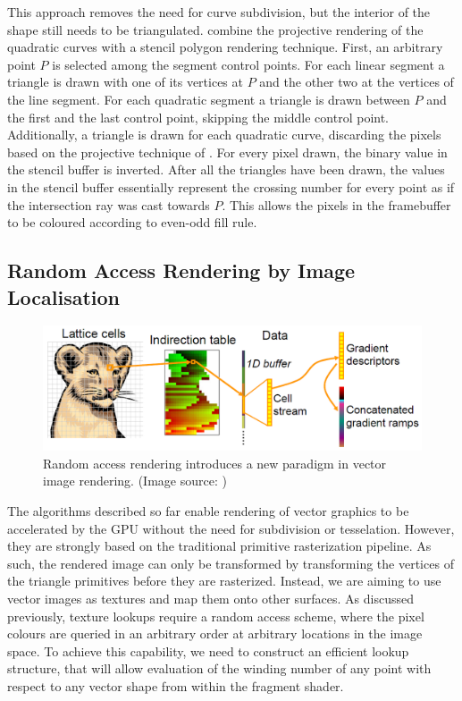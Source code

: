 \documentclass[11pt,a4paper,twoside]{article}
\begin{document}
This approach removes the need for curve subdivision, but the interior of the shape still needs to be triangulated. \cite{Kokojima06} combine the projective rendering of the quadratic curves with a stencil polygon rendering technique. First, an arbitrary point $P$ is selected among the segment control points. For each linear segment a triangle is drawn with one of its vertices at $P$ and the other two at the vertices of the line segment. For each quadratic segment a triangle is drawn between $P$ and the first and the last control point, skipping the middle control point. Additionally, a triangle is drawn for each quadratic curve, discarding the pixels based on the projective technique of \cite{LoopBlinn05}. For every pixel drawn, the binary value in the stencil buffer is inverted. After all the triangles have been drawn, the values in the stencil buffer essentially represent the crossing number for every point as if the intersection ray was cast towards $P$. This allows the pixels in the framebuffer to be coloured according to even-odd fill rule.

\subsection {Random Access Rendering by Image Localisation}

\begin {figure}
	\centering
	\includegraphics [width=1.0\columnwidth] {figures/nehab_hoppe}
	\caption {Random access rendering introduces a new paradigm in vector image rendering. (Image source: \cite{NehabHoppe08}) }
	\label {fig:nehab_hoppe}
\end {figure}

The algorithms described so far enable rendering of vector graphics to be accelerated by the GPU without the need for subdivision or tesselation. However, they are strongly based on the traditional primitive rasterization pipeline. As such, the rendered image can only be transformed by transforming the vertices of the triangle primitives before they are rasterized. Instead, we are aiming to use vector images as textures and map them onto other surfaces. As discussed previously, texture lookups require a random access scheme, where the pixel colours are queried in an arbitrary order at arbitrary locations in the image space. To achieve this capability, we need to construct an efficient lookup structure, that will allow evaluation of the winding number of any point with respect to any vector shape from within the fragment shader.
\end{document}
